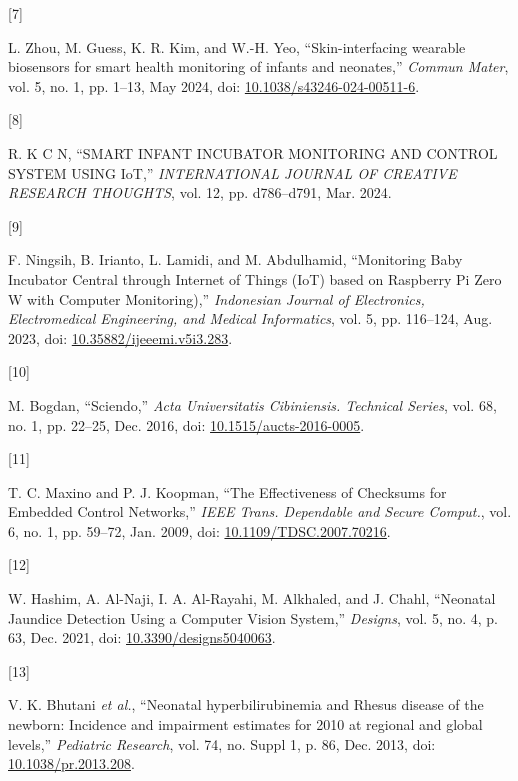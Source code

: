 \documentclass{article}
\newlength{\cslhangindent}
\newlength{\csllabelwidth}
\newenvironment{CSLReferences}[2] %
 {\begin{list}{}{%
  \setlength{\itemindent}{0pt}
  \setlength{\leftmargin}{0pt}
  \setlength{\parsep}{0pt}
  \ifodd #1
   \setlength{\leftmargin}{\cslhangindent}
   \setlength{\itemindent}{-1\cslhangindent}
  \fi
  \setlength{\itemsep}{#2\baselineskip}}}
 {\end{list}}
\newcommand{\CSLLeftMargin}[1]{\parbox[t]{\csllabelwidth}{#1}}
\newcommand{\CSLRightInline}[1]{\parbox[t]{\linewidth - \csllabelwidth}{#1}\break}
\begin{document}
\begin{CSLReferences}{0}{0}
\CSLLeftMargin{{[}7{]} }%
\CSLRightInline{L. Zhou, M. Guess, K. R. Kim, and W.-H. Yeo,
{``Skin-interfacing wearable biosensors for smart health monitoring of
infants and neonates,''} \emph{Commun Mater}, vol. 5, no. 1, pp. 1--13,
May 2024, doi:
\href{https://doi.org/10.1038/s43246-024-00511-6}{10.1038/s43246-024-00511-6}.}

\CSLLeftMargin{{[}8{]} }%
\CSLRightInline{R. K C N, {``{SMART} {INFANT} {INCUBATOR} {MONITORING}
{AND} {CONTROL} {SYSTEM} {USING} {IoT},''} \emph{INTERNATIONAL JOURNAL
OF CREATIVE RESEARCH THOUGHTS}, vol. 12, pp. d786--d791, Mar. 2024.}

\CSLLeftMargin{{[}9{]} }%
\CSLRightInline{F. Ningsih, B. Irianto, L. Lamidi, and M. Abdulhamid,
{``Monitoring {Baby} {Incubator} {Central} through {Internet} of
{Things} ({IoT}) based on {Raspberry} {Pi} {Zero} {W} with {Computer}
{Monitoring}),''} \emph{Indonesian Journal of Electronics,
Electromedical Engineering, and Medical Informatics}, vol. 5, pp.
116--124, Aug. 2023, doi:
\href{https://doi.org/10.35882/ijeeemi.v5i3.283}{10.35882/ijeeemi.v5i3.283}.}

\CSLLeftMargin{{[}10{]} }%
\CSLRightInline{M. Bogdan, {``Sciendo,''} \emph{Acta Universitatis
Cibiniensis. Technical Series}, vol. 68, no. 1, pp. 22--25, Dec. 2016,
doi:
\href{https://doi.org/10.1515/aucts-2016-0005}{10.1515/aucts-2016-0005}.}

\CSLLeftMargin{{[}11{]} }%
\CSLRightInline{T. C. Maxino and P. J. Koopman, {``The {Effectiveness}
of {Checksums} for {Embedded} {Control} {Networks},''} \emph{IEEE Trans.
Dependable and Secure Comput.}, vol. 6, no. 1, pp. 59--72, Jan. 2009,
doi:
\href{https://doi.org/10.1109/TDSC.2007.70216}{10.1109/TDSC.2007.70216}.}

\CSLLeftMargin{{[}12{]} }%
\CSLRightInline{W. Hashim, A. Al-Naji, I. A. Al-Rayahi, M. Alkhaled, and
J. Chahl, {``Neonatal {Jaundice} {Detection} {Using} a {Computer}
{Vision} {System},''} \emph{Designs}, vol. 5, no. 4, p. 63, Dec. 2021,
doi:
\href{https://doi.org/10.3390/designs5040063}{10.3390/designs5040063}.}

\CSLLeftMargin{{[}13{]} }%
\CSLRightInline{V. K. Bhutani \emph{et al.}, {``Neonatal
hyperbilirubinemia and {Rhesus} disease of the newborn: Incidence and
impairment estimates for 2010 at regional and global levels,''}
\emph{Pediatric Research}, vol. 74, no. Suppl 1, p. 86, Dec. 2013, doi:
\href{https://doi.org/10.1038/pr.2013.208}{10.1038/pr.2013.208}.}


\end{CSLReferences}
\end{document}
